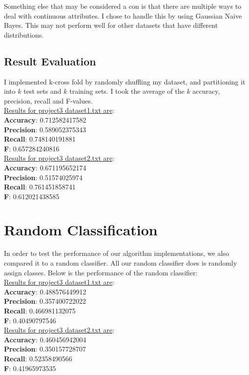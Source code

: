 \documentclass[paper=letter, fontsize=11pt]{article}
\numberwithin{equation}{section}		%
\numberwithin{figure}{section}			%
\numberwithin{table}{section}				%
\begin{document}
\noindent Something else that may be considered a con is that there are multiple ways to deal with continuous attributes. I chose to handle this by using Gaussian Naive Bayes. This may not perform well for other datasets that have different distributions. 

\subsection{Result Evaluation}
I implemented k-cross fold by randomly shuffling my dataset, and partitioning it into $k$ test sets and $k$ training sets. I took the average of the $k$ accuracy, precision, recall and F-values. \\

\noindent \underline{Results for project3 dataset1.txt are}: \\ 
\textbf{Accuracy}: 0.712582417582\\
\textbf{Precision}: 0.589052375343\\
\textbf{Recall}: 0.748140191881\\
\textbf{F}: 0.657284240816\\

\noindent \underline{Results for project3 dataset2.txt are}:\\
\textbf{Accuracy}: 0.671195652174\\
\textbf{Precision}: 0.51574025974\\
\textbf{Recall}: 0.761451858741\\
\textbf{F}: 0.612021438585\\

\section{Random Classification}
In order to test the performance of our algorithm implementations, we also compared it to a random classifier. All our random classifier does is randomly assign classes. Below is the performance of the random classifier: \\

\noindent \underline{Results for project3 dataset1.txt are}: \\ 
\textbf{Accuracy}: 0.488576449912\\
\textbf{Precision}: 0.357400722022\\
\textbf{Recall}: 0.466981132075\\
\textbf{F}: 0.40490797546\\

\noindent \underline{Results for project3 dataset2.txt are}:\\
\textbf{Accuracy}: 0.460456942004\\
\textbf{Precision}: 0.350157728707\\
\textbf{Recall}: 0.52358490566\\
\textbf{F}: 0.41965973535\\


\end{document}
